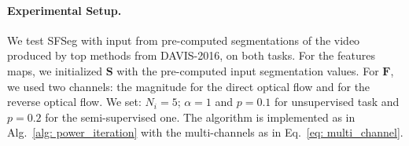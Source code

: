 \documentclass{article}
\begin{document}
\paragraph{Experimental Setup.} We test SFSeg with input from pre-computed segmentations of the video produced by top methods from DAVIS-2016, on both tasks. For the features maps, we initialized $\mathbf{S}$ with the pre-computed input segmentation values. For $\mathbf{F}$, we used two channels: the magnitude for the direct optical flow and for the reverse optical flow. We set: $N_{i} = 5$; $\alpha = 1$ and $p = 0.1$ for unsupervised task and $p = 0.2$ for the semi-supervised one. The algorithm is implemented as in Alg.~\ref{alg: power_iteration} with the multi-channels as in Eq.~\ref{eq: multi_channel}.

\end{document}
